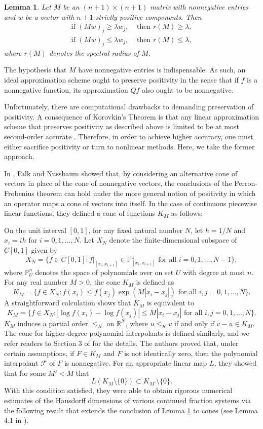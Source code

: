 \documentclass[10pt]{article}
\newtheorem{lemma}[theorem]{Lemma}
\theoremstyle{definition}
\numberwithin{equation}{section}
\numberwithin{figure}{section}
\numberwithin{table}{section}
\begin{document}
\begin{lemma}
Let $M$ be an $(n+1)\times(n+1)$ matrix with nonnegative entries and $w$ be a vector with $n+1$ strictly positive components. Then
\begin{align*}
\text{if } (Mw)_j\geq\lambda w_j,&\text{ then } r(M)\geq\lambda,\\
\text{if } (Mw)_j\leq\lambda w_j,&\text{ then } r(M)\leq\lambda,
\end{align*}
where $r(M)$ denotes the spectral radius of $M$.
\label{lem:pos_mat}
\end{lemma}

The hypothesis that $M$ have nonnegative entries is indispensable. As such, an ideal approximation scheme ought to preserve positivity in the sense that if $f$ is a nonnegative function, its approximation $Qf$ also ought to be nonnegative.

Unfortunately, there are computational drawbacks to demanding preservation of positivity. A consequence of Korovkin's Theorem is that any linear approximation scheme that preserves positivity as described above is limited to be at most second-order accurate \cite{korovkin1957order}. Therefore, in order to achieve higher accuracy, one must either sacrifice positivity or turn to nonlinear methods. Here, we take the former approach.

In \cite{falk2021hidden}, Falk and Nussbaum showed that, by considering an alternative cone of vectors in place of the cone of nonnegative vectors, the conclusions of the Perron-Frobenius theorem can hold under the more general notion of positivity in which an operator maps a cone of vectors into itself. In the case of continuous piecewise linear functions, they defined a cone of functions $K_M$ as follows:

On the unit interval $[0,1]$, for any fixed natural number $N$, let $h=1/N$ and $x_i=ih$ for $i=0,1,\dots,N$. Let $X_N$ denote the finite-dimensional subspace of $C[0,1]$ given by $$X_N=\{f\in C[0,1]:f|_{[x_i,x_{i+1}]}\in\mathbb{P}^1_{[x_i,x_{i+1}]}\text{ for all $i=0,1,\dots,N-1$}\},$$
where $\mathbb{P}^n_{U}$ denotes the space of polynomials over on set $U$ with degree at most $n$. For any real number $M>0$, the cone $K_M$ is defined as
$$K_M=\{f\in X_N:f(x_i)\leq f(x_j)\exp(M|x_i-x_j|)\text{ for all $i,j=0,1,\dots,N$}\}.$$
A straightforward calculation shows that $K_M$ is equivalent to 
$$K_M=\{f\in X_N:|\log f(x_i)-\log f(x_j)|\leq M|x_i-x_j|\text{ for all $i,j=0,1,\dots,N$}\}.$$
$K_M$ induces a partial order $\leq_K$ on $\mathbb{R}^N$, where $u\leq_K v$ if and only if $v-u\in K_M$. The cone for higher-degree polynomial interpolants is defined similarly, and we refer readers to Section 3 of \cite{falk2021hidden} for the details. The authors proved that, under certain assumptions, if $F\in K_M$ and $F$ is not identically zero, then the polynomial interpolant $\mathcal{F}$ of $F$ is nonnegative. For an appropriate linear map $L$, they showed that for some $M'<M$ that
$$L(K_M\setminus\{0\})\subset K_{M'}\setminus\{0\}.$$
With this condition satisfied, they were able to obtain rigorous numerical estimates of the Hausdorff dimensions of various continued fraction systems via the following result that extends the conclusion of Lemma \ref{lem:pos_mat} to cones (see Lemma 4.1 in \cite{falk2021hidden}).
\end{document}

